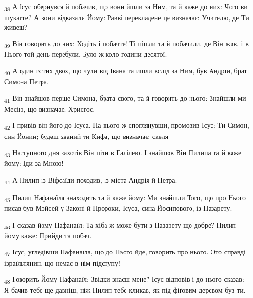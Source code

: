 \begin{tcolorbox}
\textsubscript{38} А Ісус обернувся й побачив, що вони йшли за Ним, та й каже до них: Чого ви шукаєте? А вони відказали Йому: Равві перекладене це визначає: Учителю, де Ти живеш?
\end{tcolorbox}
\begin{tcolorbox}
\textsubscript{39} Він говорить до них: Ходіть і побачте! Ті пішли та й побачили, де Він жив, і в Нього той день перебули. Було ж коло години десятої.
\end{tcolorbox}
\begin{tcolorbox}
\textsubscript{40} А один із тих двох, що чули від Івана та йшли вслід за Ним, був Андрій, брат Симона Петра.
\end{tcolorbox}
\begin{tcolorbox}
\textsubscript{41} Він знайшов перше Симона, брата свого, та й говорить до нього: Знайшли ми Месію, що визначає: Христос.
\end{tcolorbox}
\begin{tcolorbox}
\textsubscript{42} І привів він його до Ісуса. На нього ж споглянувши, промовив Ісус: Ти Симон, син Йонин; будеш званий ти Кифа, що визначає: скеля.
\end{tcolorbox}
\begin{tcolorbox}
\textsubscript{43} Наступного дня захотів Він піти в Галілею. І знайшов Він Пилипа та й каже йому: Іди за Мною!
\end{tcolorbox}
\begin{tcolorbox}
\textsubscript{44} А Пилип із Віфсаїди походив, із міста Андрія й Петра.
\end{tcolorbox}
\begin{tcolorbox}
\textsubscript{45} Пилип Нафанаїла знаходить та й каже йому: Ми знайшли Того, що про Нього писав був Мойсей у Законі й Пророки, Ісуса, сина Йосипового, із Назарету.
\end{tcolorbox}
\begin{tcolorbox}
\textsubscript{46} І сказав йому Нафанаїл: Та хіба ж може бути з Назарету що добре? Пилип йому каже: Прийди та побач.
\end{tcolorbox}
\begin{tcolorbox}
\textsubscript{47} Ісус, угледівши Нафанаїла, що до Нього йде, говорить про нього: Ото справді ізраїльтянин, що немає в нім підступу!
\end{tcolorbox}
\begin{tcolorbox}
\textsubscript{48} Говорить Йому Нафанаїл: Звідки знаєш мене? Ісус відповів і до нього сказав: Я бачив тебе ще давніш, ніж Пилип тебе кликав, як під фіґовим деревом був ти.
\end{tcolorbox}
